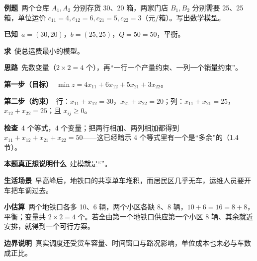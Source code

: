 \begin{examplebox}
\textbf{例题}\ 两个仓库 $A_1,A_2$ 分别存货 30、20 箱，两家门店 $B_1,B_2$ 分别需要 25、25 箱，单位运价 $c_{11}=4,c_{12}=6,c_{21}=5,c_{22}=3$（元/箱）。写出数学模型。\par
\begin{minipage}{0.6\linewidth}
\textbf{已知}\ $a=(30,20)$，$b=(25,25)$，$Q=50=50$，平衡。\par
\textbf{求}\ 使总运费最小的模型。\par
\textbf{思路}\ 先数变量（$2\times2=4$ 个），再“一行一个产量约束、一列一个销量约束”。\par
\end{minipage}\hfill
\begin{minipage}{0.37\linewidth}\centering
{}
\end{minipage}
\textbf{第一步（目标）}\ $\min z=4x_{11}+6x_{12}+5x_{21}+3x_{22}$。\par
\textbf{第二步（约束）}\ 行：$x_{11}+x_{12}=30$，$x_{21}+x_{22}=20$；列：$x_{11}+x_{21}=25$，$x_{12}+x_{22}=25$；且 $x_{ij}\ge0$。\par
\textbf{检查}\ 4 个等式，4 个变量；把两行相加、两列相加都得到 $x_{11}+x_{12}+x_{21}+x_{22}=50$——这已经暗示 4 个等式里有一个是“多余”的（1.4 节）。\par
\textbf{本题真正想说明什么}\ 建模就是“”。
\end{examplebox}

\begin{lifebox}[共享单车的夜间调度]
\textbf{生活场景}\ 早高峰后，地铁口的共享单车堆积，而居民区几乎无车，运维人员要开车把车调过去。\par
{}
\textbf{小估算}\ 两个地铁口各多 10、6 辆，两个小区各缺 8、8 辆，$10+6=16=8+8$，平衡；变量共 $2\times2=4$ 个。若全由第一个地铁口供应第一个小区 8 辆、其余就近安排，就得到一个可行方案。\par
\textbf{边界说明}\ 真实调度还受货车容量、时间窗口与路况影响，单位成本也未必与车数成正比。
\end{lifebox}

